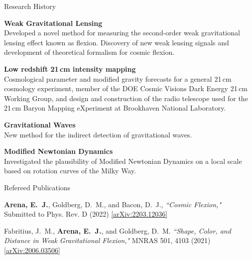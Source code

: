 \documentclass{resume} %
\begin{document}
\begin{rSection}{Research History}

\begin{description}[leftmargin=8em, style=nextline]

\item[\textnormal{2018 -- Present}] \textbf{Weak Gravitational Lensing}\\
  Developed a novel method for measuring the second-order weak gravitational lensing effect known as flexion.
  Discovery of new weak lensing signals and development of theoretical formalism for cosmic flexion. 
\item[\textnormal{2015 -- 2019}] \textbf{Low redshift 21$\,$cm intensity mapping}\\
 Cosmological parameter and modified gravity forecasts for a general 21$\,$cm cosmology 
 experiment, member of the DOE Cosmic Visions Dark Energy 21$\,$cm Working Group, and design and construction
 of the radio telescope used for the 21$\,$cm Baryon Mapping eXperiment at Brookhaven National
 Laboratory.
\item[\textnormal{2013}] \textbf{Gravitational Waves}\\
  New method for the indirect detection of gravitational waves.
\item[\textnormal{2012}] \textbf{Modified Newtonian Dynamics}\\
 Investigated the plausibility of Modified Newtonian Dynamics on a local scale based on
 rotation curves of the Milky Way.

\end{description}

\end{rSection}


\begin{rSection}{Refereed Publications}

\begin{etaremune}
\item \textbf{{Arena}, E.~J.}, {Goldberg}, D.~M., and {Bacon}, D.~J., \textit{``Cosmic Flexion,"} Submitted to Phys. Rev. D (2022) \href{https://arxiv.org/abs/2203.12036}{[arXiv:2203.12036]}
  
\item {Fabritius}, J.~M., \textbf{{Arena}, E.~J.}, and {Goldberg}, D.~M. \textit{``Shape, Color, and Distance in Weak Gravitational Flexion,"} MNRAS 501, 4103 (2021) \href{https://arxiv.org/abs/2006.03506}{[arXiv:2006.03506]}
\end{etaremune}

\end{rSection}
\end{document}
